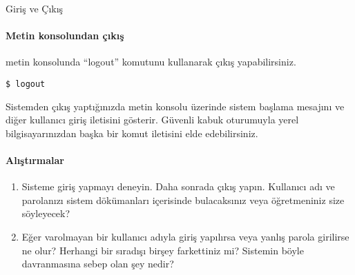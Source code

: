 \begin{section}{Giriş ve Çıkış}
\paragraph{Metin konsolundan çıkış}{metin konsolunda “logout” komutunu kullanarak çıkış yapabilirsiniz.}

\footnotesize
\begin{verbatim}
$ logout
\end{verbatim}
\normalsize

Sistemden çıkış yaptığınızda metin konsolu üzerinde sistem başlama mesajını ve diğer kullanıcı giriş iletisini gösterir. Güvenli kabuk oturumuyla yerel bilgisayarınızdan başka bir komut iletisini elde edebilirsiniz. 

\paragraph{{\Huge{\PencilLeftDown}}Alıştırmalar}{
\begin{enumerate}
 \item Sisteme giriş yapmayı deneyin. Daha sonrada çıkış yapın. Kullanıcı adı ve parolanızı sistem dökümanları içerisinde bulacaksınız veya öğretmeniniz size söyleyecek?
 \item Eğer varolmayan bir kullanıcı adıyla giriş yapılırsa veya yanlış parola girilirse ne olur? Herhangi bir sıradışı birşey farkettiniz mi? Sistemin böyle davranmasına sebep olan şey nedir?
\end{enumerate}}
\end{section}

